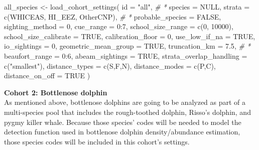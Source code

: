 \documentclass[
]{book}
\newenvironment{Shaded}{\begin{snugshade}}{\end{snugshade}}
\newcommand{\AttributeTok}[1]{\textcolor[rgb]{0.77,0.63,0.00}{#1}}
\newcommand{\CommentTok}[1]{\textcolor[rgb]{0.56,0.35,0.01}{\textit{#1}}}
\newcommand{\ConstantTok}[1]{\textcolor[rgb]{0.00,0.00,0.00}{#1}}
\newcommand{\DecValTok}[1]{\textcolor[rgb]{0.00,0.00,0.81}{#1}}
\newcommand{\FloatTok}[1]{\textcolor[rgb]{0.00,0.00,0.81}{#1}}
\newcommand{\FunctionTok}[1]{\textcolor[rgb]{0.00,0.00,0.00}{#1}}
\newcommand{\NormalTok}[1]{#1}
\newcommand{\OtherTok}[1]{\textcolor[rgb]{0.56,0.35,0.01}{#1}}
\newcommand{\SpecialCharTok}[1]{\textcolor[rgb]{0.00,0.00,0.00}{#1}}
\newcommand{\StringTok}[1]{\textcolor[rgb]{0.31,0.60,0.02}{#1}}
\begin{document}
\begin{Shaded}
\begin{Highlighting}[]
\NormalTok{all\_species }\OtherTok{\textless{}{-}} \FunctionTok{load\_cohort\_settings}\NormalTok{(}
  \AttributeTok{id =} \StringTok{"all"}\NormalTok{, }\CommentTok{\# *}
  \AttributeTok{species =} \ConstantTok{NULL}\NormalTok{, }
  \AttributeTok{strata =} \FunctionTok{c}\NormalTok{(}\StringTok{\textquotesingle{}WHICEAS\textquotesingle{}}\NormalTok{, }\StringTok{\textquotesingle{}HI\_EEZ\textquotesingle{}}\NormalTok{, }\StringTok{\textquotesingle{}OtherCNP\textquotesingle{}}\NormalTok{), }\CommentTok{\# *}
  \AttributeTok{probable\_species =} \ConstantTok{FALSE}\NormalTok{,}
  \AttributeTok{sighting\_method =} \DecValTok{0}\NormalTok{,}
  \AttributeTok{cue\_range =} \DecValTok{0}\SpecialCharTok{:}\DecValTok{7}\NormalTok{,}
  \AttributeTok{school\_size\_range =} \FunctionTok{c}\NormalTok{(}\DecValTok{0}\NormalTok{, }\DecValTok{10000}\NormalTok{),}
  \AttributeTok{school\_size\_calibrate =} \ConstantTok{TRUE}\NormalTok{,}
  \AttributeTok{calibration\_floor =} \DecValTok{0}\NormalTok{,}
  \AttributeTok{use\_low\_if\_na =} \ConstantTok{TRUE}\NormalTok{,}
  \AttributeTok{io\_sightings =} \DecValTok{0}\NormalTok{,}
  \AttributeTok{geometric\_mean\_group =} \ConstantTok{TRUE}\NormalTok{,}
  \AttributeTok{truncation\_km =} \FloatTok{7.5}\NormalTok{, }\CommentTok{\# *}
  \AttributeTok{beaufort\_range =} \DecValTok{0}\SpecialCharTok{:}\DecValTok{6}\NormalTok{,}
  \AttributeTok{abeam\_sightings =} \ConstantTok{TRUE}\NormalTok{,}
  \AttributeTok{strata\_overlap\_handling =} \FunctionTok{c}\NormalTok{(}\StringTok{"smallest"}\NormalTok{),}
  \AttributeTok{distance\_types =} \FunctionTok{c}\NormalTok{(}\StringTok{\textquotesingle{}S\textquotesingle{}}\NormalTok{,}\StringTok{\textquotesingle{}F\textquotesingle{}}\NormalTok{,}\StringTok{\textquotesingle{}N\textquotesingle{}}\NormalTok{),}
  \AttributeTok{distance\_modes =} \FunctionTok{c}\NormalTok{(}\StringTok{\textquotesingle{}P\textquotesingle{}}\NormalTok{,}\StringTok{\textquotesingle{}C\textquotesingle{}}\NormalTok{),}
  \AttributeTok{distance\_on\_off =} \ConstantTok{TRUE}
\NormalTok{)}
\end{Highlighting}
\end{Shaded}

\textbf{Cohort 2: Bottlenose dolphin}\\
As mentioned above, bottlenose dolphins are going to be analyzed as part of a multi-species pool that includes the rough-toothed dolphin, Risso's dolphin, and pygmy killer whale. Because those species' codes will be needed to model the detection function used in bottlenose dolphin density/abundance estimation, those species codes will be included in this cohort's settings.
\end{document}
